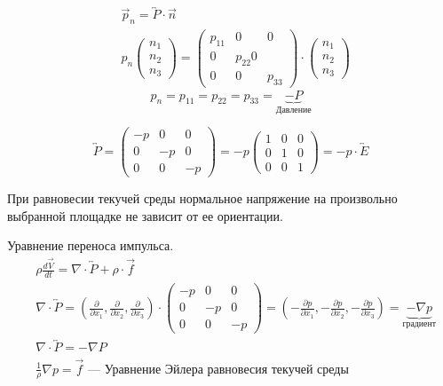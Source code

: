 \begin{note}
  \begin{align*}
    &\vec{p}_n = \overleftrightarrow{P} \cdot \vec{n} \\
    &p_n \begin{pmatrix}
        n_1 \\
        n_2 \\
        n_3
      \end{pmatrix} = \begin{pmatrix} p_{11} &0 &0 \\
        0 &p_{22} 0 \\
        0 &0 &p_{33}
    \end{pmatrix} \cdot
               \begin{pmatrix}
                 n_1 \\
                 n_2 \\
                 n_3
               \end{pmatrix}
  \end{align*}
\[
p_n = p_{11} = p_{22} = p_{33} = \underbrace{-P}_{Давление}
\]
\end{note}

\[
\overleftrightarrow{P} =
\begin{pmatrix}
  -p &0 &0\\
  0 &-p &0\\
  0 &0 &-p
\end{pmatrix} = -p
\begin{pmatrix}
  1 &0 &0 \\
  0 &1 &0 \\
  0 &0 &1
\end{pmatrix} = -p \cdot \overleftrightarrow{E}
\]

\begin{note}
  При равновесии текучей среды нормальное напряжение на произвольно выбранной
  площадке не зависит от ее ориентации.
\end{note}

Уравнение переноса импульса.
\begin{align*}
  & \rho \frac{d\vec{V}}{dt} = \nabla \cdot \overleftrightarrow{P} + \rho \cdot \vec{f} \\
  & \nabla \cdot \overleftrightarrow{P} = (\frac{\partial}{\partial x_1}, \frac{\partial}{\partial x_2}, \frac{\partial}{\partial x_3}) \cdot
    \begin{pmatrix}
      -p &0 &0 \\
      0 &-p &0 \\
      0 &0 &-p
    \end{pmatrix} = (-\frac{\partial p}{\partial x_1}, -\frac{\partial p}{\partial x_2}, -\frac{\partial p}{\partial x_3}) = \underbrace{-\nabla p}_{градиент}\\
  &\nabla \cdot \overleftrightarrow{P}= - \nabla P \\
  &\frac 1\rho \nabla p = \vec{f} \text{ --- Уравнение Эйлера равновесия текучей среды}
\end{align*}

